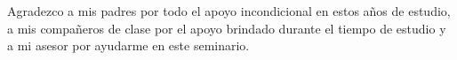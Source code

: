 \documentclass[12pt,spanish, singlespacing,]{MastersDoctoralThesis}
\newcommand\blankpage{%
    \null
    \thispagestyle{empty}%
    \addtocounter{page}{0}%
    \newpage}
\begin{document}
Agradezco a mis padres por todo el apoyo incondicional en estos años de estudio, a mis compañeros de clase por el apoyo brindado durante el tiempo de estudio y a mi asesor por ayudarme en este seminario.



\afterpage{\blankpage}

\mainmatter 
\pagestyle{thesis}


$\ $

$\ $

$\ $




\afterpage{\blankpage}
\appendix

\end{document}
